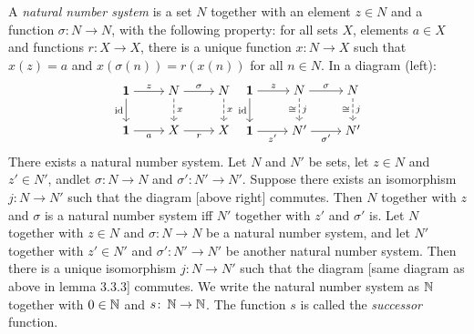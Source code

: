  A \textit{natural number system} is a set $N$ together with an element $z \in N$ and a function $\sigma \colon N \to N$, with the following property: for all sets $X$, elements $a \in X$ and functions $r \colon X \to X$, there is a unique function $x \colon N \to X$ such that $x(z) = a$ and $x(\sigma(n)) = r(x(n))$ for all $n \in N$. In a diagram (left):
\[\begin{tikzcd}[cramped]
    {\mathbf{1}} & N & N \\
    {\mathbf{1}} & X & X
    \arrow["z", from=1-1, to=1-2]
    \arrow["{\text{id}}"', from=1-1, to=2-1]
    \arrow["\sigma", from=1-2, to=1-3]
    \arrow["x", dashed, from=1-2, to=2-2]
    \arrow["x", dashed, from=1-3, to=2-3]
    \arrow["a"', from=2-1, to=2-2]
    \arrow["r"', from=2-2, to=2-3]
\end{tikzcd}
\begin{tikzcd}[cramped]
    {\mathbf{1}} & N & N \\
    {\mathbf{1}} & {N'} & {N'}
    \arrow["z", from=1-1, to=1-2]
    \arrow["{\text{id}}"', from=1-1, to=2-1]
    \arrow["\sigma", from=1-2, to=1-3]
    \arrow["j", "\cong"', dashed, from=1-2, to=2-2]
    \arrow["j", "\cong"', dashed, from=1-3, to=2-3]
    \arrow["{z'}"', from=2-1, to=2-2]
    \arrow["{\sigma'}"', from=2-2, to=2-3]
\end{tikzcd}\]
 There exists a natural number system.
 Let $N$ and $N'$ be sets, let $z \in N$ and $z' \in N'$, andlet $\sigma \colon N \to N$ and $\sigma' \colon N' \to N'$. Suppose there exists an isomorphism $j \colon N \to N'$ such that the diagram [above right] commutes. Then $N$ together with $z$ and $\sigma$ is a natural number system iff $N'$ together with $z'$ and $\sigma'$ is.
 Let $N$ together with $z \in N$ and $\sigma \colon N \to N$ be a natural number system, and let $N'$ together with $z' \in N'$ and $\sigma' \colon N' \to N'$ be another natural number system. Then there is a unique isomorphism $j \colon N \to N'$ such that the diagram [same diagram as above in lemma 3.3.3] commutes.
 We write the natural number system as $\operatorname{\mathbb{N}}$ together with $0 \in \operatorname{\mathbb{N}}$ and $s \colon \operatorname{\mathbb{N}} \to \operatorname{\mathbb{N}}$. The function $s$ is called the \textit{successor} function.